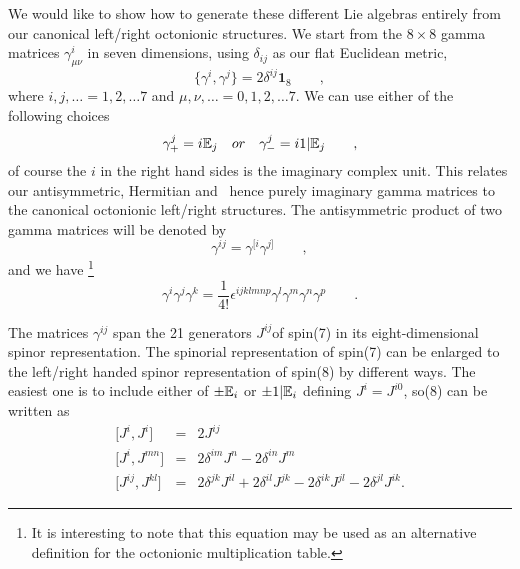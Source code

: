 \documentclass[a4paper,12pt]{book}
\begin{document}
We would like to show how to generate these different Lie algebras entirely
from our canonical left/right octonionic structures. We start from the $%
8\times 8$ gamma matrices $\gamma _{\mu \nu }^{i}$ in seven dimensions,
using $\delta _{ij}$ as our flat Euclidean metric, 
\begin{equation}
\{\gamma ^{i},\gamma ^{j}\}=2\delta ^{ij}\mathbf{1}_{8}\qquad ,
\end{equation}
where $i,j,\ldots =1,2,\ldots 7$ and $\mu ,\nu ,\ldots =0,1,2,\ldots 7$. We
can use either of the following choices 
\begin{equation}
\gamma _{+}^{j}=i\Bbb{E}_{j}\quad or\quad \gamma _{-}^{j}=i1|\Bbb{E}%
_{j}\qquad ,  \label{cliffo}
\end{equation}
of course the $i$ in the right hand sides is the imaginary complex unit.
This relates our antisymmetric, Hermitian and \ hence purely imaginary gamma
matrices to the canonical octonionic left/right structures. The
antisymmetric product of two gamma matrices will be denoted by 
\begin{equation}
\gamma ^{ij}=\gamma ^{[i}\gamma ^{j]}\qquad ,
\end{equation}
and we have \footnote{%
It is interesting to note that this equation may be used as an alternative
definition for the octonionic multiplication table.} 
\begin{equation}
\gamma ^{i}\gamma ^{j}\gamma ^{k}=\frac{1}{4!}\epsilon ^{ijklmnp}\gamma
^{l}\gamma ^{m}\gamma ^{n}\gamma ^{p}\qquad .
\end{equation}

The matrices $\gamma ^{ij}$ span the 21 generators $J^{ij}$of spin(7) in its
eight-dimensional spinor representation. The spinorial representation of
spin(7) can be enlarged to the left/right handed spinor representation of
spin(8) by different ways. The easiest one is to include either of $\pm \Bbb{%
E}_{i}$ or $\pm 1|\Bbb{E}_{i}$ \cite{c10}\cite{gunn1}\cite{gunket} defining $%
J^{i}=J^{i0}$, so(8) can be written as 
\begin{eqnarray}
\lbrack J^{i},J^{i}] &=&2J^{ij} \\
\lbrack J^{i},J^{mn}] &=&2\delta ^{im}J^{n}-2\delta ^{in}J^{m} \\
\lbrack J^{ij},J^{kl}] &=&2\delta ^{jk}J^{il}+2\delta ^{il}J^{jk}-2\delta
^{ik}J^{jl}-2\delta ^{jl}J^{ik}.
\end{eqnarray}
\end{document}
